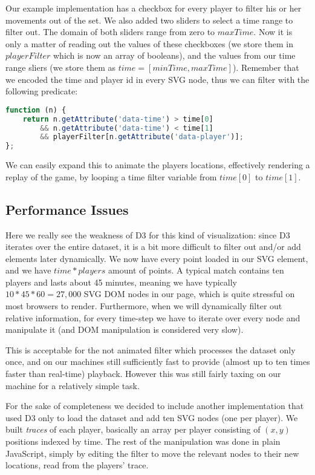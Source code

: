 Our example implementation has a checkbox for every player to filter his or her movements out of the set. We also added two sliders to select a time range to filter out. The domain of both sliders range from zero to $maxTime$. Now it is only a
matter of reading out the values of these checkboxes (we store them in $playerFilter$ which is now an array of booleans), and the values from our time range sliers (we store them as $time = [minTime, maxTime]$). Remember that we encoded the time and player id in every SVG node, thus we can filter with the following predicate:
\begin{lstlisting}[language=JavaScript]
function (n) {
    return n.getAttribute('data-time') > time[0]
        && n.getAttribute('data-time') < time[1]
        && playerFilter[n.getAttribute('data-player')];
};
\end{lstlisting}

We can easily expand this to animate the players locations, effectively rendering a replay of the game, by looping a time filter variable from $time[0]$ to $time[1]$.

\subsection{Performance Issues}
Here we really see the weakness of D3 for this kind of visualization: since D3 iterates over the entire dataset, it is a bit more difficult to filter out and/or add elements later dynamically. We now have every point loaded in our SVG element, and we have $time * players$ amount of points. A typical match contains ten players and lasts about 45 minutes, meaning we have typically $10 * 45 * 60 = 27,000$ SVG DOM nodes in our page, which is quite stressful on most browsers to render. Furthermore, when we will dynamically filter out relative information, for every time-step we have to iterate over every node and manipulate it (and DOM manipulation is considered very slow). 

This is acceptable for the not animated filter which processes the dataset only once, and on our machines still sufficiently fast to provide (almost up to ten times faster than real-time) playback. However this was still fairly taxing on our machine for a relatively simple task. 

For the sake of completeness we decided to include another implementation that used D3 only to load the dataset and add ten SVG nodes (one per player). We built \emph{traces} of each player, basically an array per player consisting of $(x, y)$ positions indexed by time. The rest of the manipulation was done in plain JavaScript, simply by editing the filter to move the relevant nodes to their new locations, read from the players' trace.
